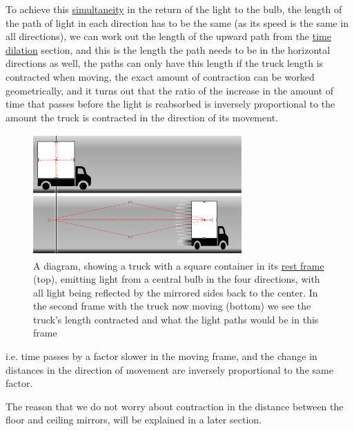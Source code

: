 To achieve this \hyperlink{def-simultaneity}{simultaneity} in the return of the light to the bulb, the length of the path of light in each direction has to be the same (as its speed is the same in all directions), we can work out the length of the upward path from the \hyperlink{def-time-dilation}{time dilation} section, and this is the length the path needs to be in the horizontal directions as well, the paths can only have this length if the truck length is contracted when moving, the exact amount of contraction can be worked geometrically, and it turns out that the ratio of the increase in the amount of time that passes before the light is reabsorbed is inversely proportional to the amount the truck is contracted in the direction of its movement.

\begin{figure}[H]
	\centering
	\includegraphics[width=8cm]{images/pdf/Full_Lorry_Transform.pdf}
	\caption{A diagram, showing a truck with a square container in its \protect\hyperlink{def-proper-frame}{rest frame} (top), emitting light from a central bulb in the four directions, with all light being reflected by the mirrored sides back to the center. In the second frame with the truck now moving (bottom) we see the truck's length contracted and what the light paths would be in this frame}
	\label{fig: full truck transform}
\end{figure}

i.e. time passes by a factor slower in the moving frame, and the change in distances in the direction of movement are inversely proportional to the same factor.

The reason that we do not worry about contraction in the distance between the floor and ceiling mirrors, will be explained in a later section.


